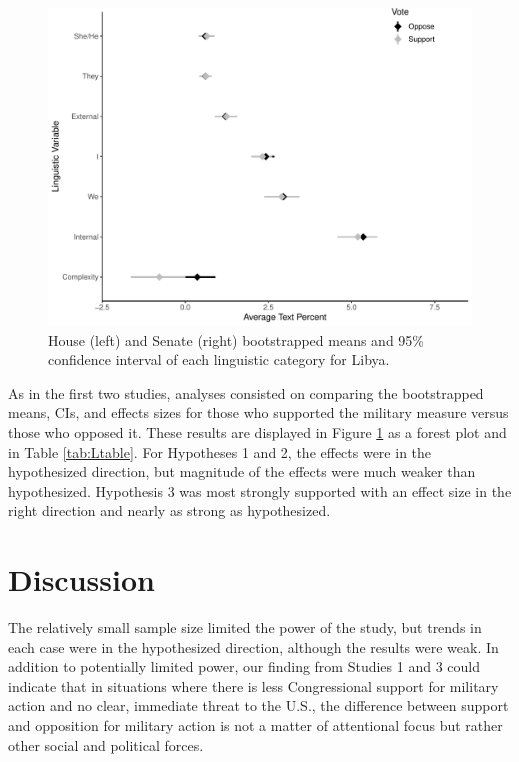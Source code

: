 \documentclass[
  english,
  ,man,floatsintext]{apa6}
\begin{document}
\begin{figure}
\centering
\includegraphics{Language-of-War-Markdown_KJ2_files/figure-latex/Lpic-1.pdf}
\caption{\label{fig:Lpic}House (left) and Senate (right) bootstrapped means and 95\% confidence interval of each linguistic category for Libya.}
\end{figure}

As in the first two studies, analyses consisted on comparing the bootstrapped means, CIs, and effects sizes for those who supported the military measure versus those who opposed it. These results are displayed in Figure \ref{fig:Lpic} as a forest plot and in Table \ref{tab:Ltable}. For Hypotheses 1 and 2, the effects were in the hypothesized direction, but magnitude of the effects were much weaker than hypothesized. Hypothesis 3 was most strongly supported with an effect size in the right direction and nearly as strong as hypothesized.

\hypertarget{discussion-2}{%
\section{Discussion}\label{discussion-2}}

The relatively small sample size limited the power of the study, but trends in each case were in the hypothesized direction, although the results were weak. In addition to potentially limited power, our finding from Studies 1 and 3 could indicate that in situations where there is less Congressional support for military action and no clear, immediate threat to the U.S., the difference between support and opposition for military action is not a matter of attentional focus but rather other social and political forces.
\end{document}
